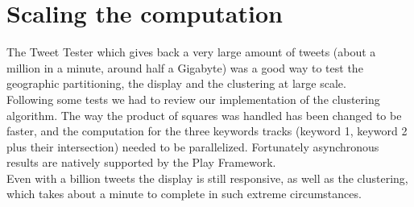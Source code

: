 \section{Scaling the computation}

The Tweet Tester which gives back a very large amount of tweets (about a million in a minute, around half a Gigabyte) was a good way to test the geographic partitioning, the display and the clustering at large scale.\\

Following some tests we had to review our implementation of the clustering algorithm. The way the product of squares was handled has been changed to be faster, and the computation for the three keywords tracks (keyword 1, keyword 2 plus their intersection) needed to be parallelized. Fortunately asynchronous results are natively supported by the Play Framework. \\

Even with a billion tweets the display is still responsive, as well as the clustering, which takes about a minute to complete in such extreme circumstances.